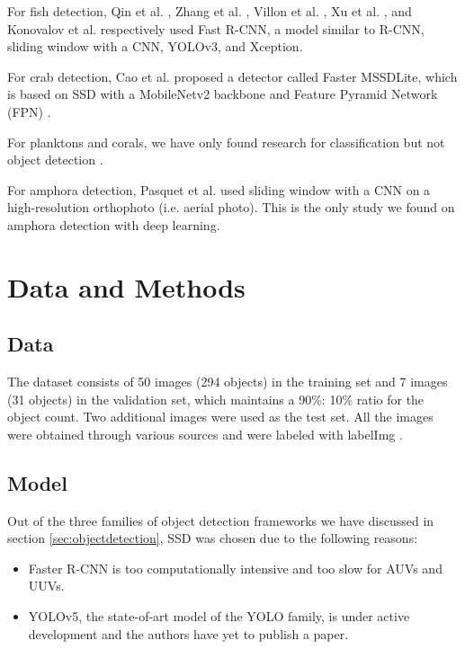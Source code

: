 \documentclass[a4paper, 11pt, oneside]{article}
\begin{document}
For fish detection, Qin et al. \cite{qin2015underwater, li2015fast}, Zhang et al. \cite{zhang2016unsupervised},
Villon et al. \cite{villon2016coral}, Xu et al. \cite{xu2018underwater}, and Konovalov et al.
\cite{konovalov2019underwater} respectively used Fast R-CNN, a model similar to R-CNN, sliding window with a CNN,
YOLOv3, and Xception.

For crab detection, Cao et al. \cite{cao2020real} proposed a detector called Faster MSSDLite, which is based on SSD with
a MobileNetv2 backbone and Feature Pyramid Network (FPN) \cite{lin2017feature}.

For planktons and corals, we have only found research for classification but not object detection
\cite{qin2015underwater, moniruzzaman2017deep}.

For amphora detection, Pasquet et al. \cite{mccarthy20193d, pasquet2017amphora} used sliding window with a CNN on a
high-resolution orthophoto (i.e. aerial photo). This is the only study we found on amphora detection with deep learning.

\section{Data and Methods}

\subsection{Data}

The dataset consists of 50 images (294 objects) in the training set and 7 images (31 objects) in the validation set,
which maintains a 90\%: 10\% ratio for the object count. Two additional images were used as the test set. All the
images were obtained through various sources
\cite{googleimages, scuba, itinari, whoi, phoenician, auscape, hakai, groplan, ionian, sanisera} and were labeled
with labelImg \cite{labelimg}.

\subsection{Model}

Out of the three families of object detection frameworks we have discussed in section \ref{sec:objectdetection}, SSD was
chosen due to the following reasons:

\begin{itemize}
  \item Faster R-CNN is too computationally intensive and too slow for AUVs and UUVs.
  \item YOLOv5, the state-of-art model of the YOLO family, is under active development and the authors have yet to
  publish a paper.
\end{itemize}
\end{document}
